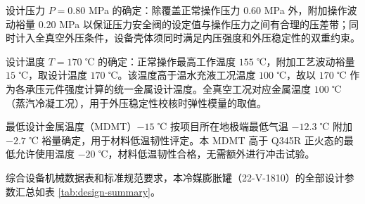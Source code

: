 设计压力 $P = 0.80$ MPa 的确定：除覆盖正常操作压力 $0.60$ MPa 外，附加操作波动裕量 $0.20$ MPa 以保证压力安全阀的设定值与操作压力之间有合理的压差带；同时计入全真空外压条件，设备壳体须同时满足内压强度和外压稳定性的双重约束。

设计温度 $T = 170$ ℃ 的确定：正常操作最高工作温度 $155$ ℃，附加工艺波动裕量 $15$ ℃，取设计温度 $170$ ℃。该温度高于温水充液工况温度 $100$ ℃，故以 $170$ ℃ 作为各承压元件强度计算的统一金属设计温度。全真空工况对应金属温度 $100$ ℃（蒸汽冷凝工况），用于外压稳定性校核时弹性模量的取值。

最低设计金属温度（MDMT）$-15$ ℃ 按项目所在地极端最低气温 $-12.3$ ℃ 附加 $-2.7$ ℃ 裕量确定，用于材料低温韧性评定\cite{hgt20585-2020}。本 MDMT 高于 Q345R 正火态的最低允许使用温度 $-20$ ℃，材料低温韧性合格，无需额外进行冲击试验。

综合设备机械数据表和标准规范要求，本冷媒膨胀罐（22-V-1810）的全部设计参数汇总如表 \ref{tab:design-summary}。

